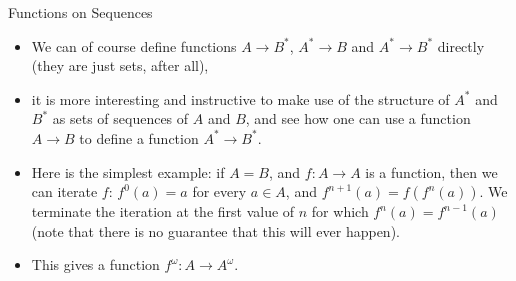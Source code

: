 \documentclass[10pt]{beamer}
\begin{document}


\begin{frame}{Functions on Sequences}


\begin{itemize}
\item We can of course define functions $A\to B^*$, $A^*\to B$ and $A^*\to B^*$ directly (they are just sets, after all),

\item it is more interesting and instructive to make use of the structure of $A^*$ and $B^*$ as sets of sequences of $A$ and $B$, and see how one can use a function $A\to B$ to define a function $A^*\to B^*$.
\item Here is the simplest example: if $A=B$, and $f:A\to A$ is a function, then we can iterate $f$: $f^0(a)=a$ for every $a\in A$, and $f^{n+1}(a) = f(f^n(a))$. We terminate the iteration at the first value of $n$ for which $f^n(a)=f^{n-1}(a)$ (note that there is no guarantee that this will ever happen).
\item This gives a function $f^\omega:A\to A^\omega$.
\end{itemize}
\end{frame}
\end{document}
